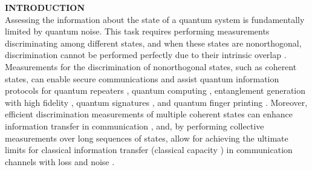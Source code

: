 \documentclass[twocolumn,pra,preprintnumbers,amsmath,amssymb,superscriptaddress,floatfix]{revtex4}%
\begin{document}
\noindent
\textbf{INTRODUCTION}
\\
Assessing the information about the state of a quantum system is
fundamentally limited by quantum noise. This task requires
performing measurements discriminating among different states, and
when these states are nonorthogonal, discrimination cannot be
performed perfectly due to their intrinsic overlap
\cite{helstrom76}. Measurements for the discrimination of
nonorthogonal states, such as coherent states, can enable
secure communications \cite{huttner95, bennett92,
grosshans02, gisin02, weedbrook12,sych10,leverrier09,leverrier11, qi15, soh15}
and assist quantum information protocols for quantum repeaters
\cite{vanloock06,vanloock08}, quantum computing
\cite{munro05,nemoto04,ralph03}, entanglement generation with high
fidelity \cite{kilin11, vanloock11}, quantum signatures
\cite{collins14, croal16}, and quantum finger printing
\cite{arrazola14, guan16}. Moreover, efficient discrimination
measurements of multiple coherent states can enhance information
transfer in communication \cite{becerra15, rosati16, lee16, tan15},
and, by performing collective measurements over long sequences of
states, allow for achieving the ultimate limits for classical
information transfer (classical capacity \cite{caves94}) in
communication channels with loss and noise \cite{giovannetti04,
giovannetti14, mari14}.
\end{document}
